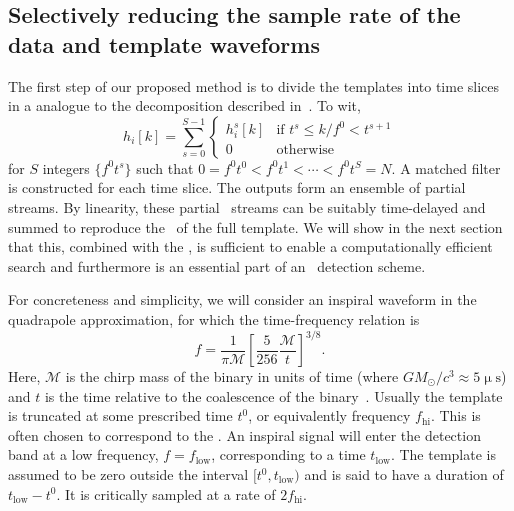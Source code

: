\subsection{Selectively reducing the sample rate of the data and template waveforms}

The first step of our proposed method is to divide the templates into time
slices in a \TD{} analogue to the \FD{} decomposition described
in~\citep{Marion2004, Buskulic2010}.  To wit,
%
\begin{equation}
\label{eq:time-slices}
h_{i}[k] = \sum_{s=0}^{S-1}
	\begin{cases}
		h_i^s[k] & \textrm{if } t^s \leqslant k / f^0 < t^{s+1} \\
		0 & \textrm{otherwise}
	\end{cases}
\end{equation}
%
for $S$ integers $\{f^0 t^s\}$ such that $0  = f^0 t^0 < f^0 t^1 < \cdots < f^0
t^S = N$.  A matched filter is constructed for each time slice.  The outputs
form an ensemble of partial \SNR{} streams.  By linearity, these partial \SNR\
streams can be suitably time-delayed and summed to reproduce the \SNR\ of the
full template.  We will show in the next section that this, combined with the
\SVD{}, is sufficient to enable a computationally efficient \TD{} search and
furthermore is an essential part of an \earlywarning\ detection scheme.

For concreteness and simplicity, we will consider an inspiral waveform in the
quadrapole approximation, for which the time-frequency relation is
%
\begin{equation} \label{eq:fgw}
%
f = \frac{1}{\mathcal{\pi M}} \left[ \frac{5}{256}\frac{\mathcal{M}}{t}
\right]^{3/8}.
%
\end{equation}
%
Here, $\mathcal{M}$ is the chirp mass of the binary in units of time (where $G
M_\odot / c^3 \approx 5 \upmu\mathrm{s}$) and $t$ is the time relative to the
coalescence of the binary~\citep{findchirppaper, kidder1992}.  Usually the
template is truncated at some prescribed time $t^0$, or equivalently frequency
$f_\mathrm{hi}$.  This is often chosen to correspond to the \ISCO. An inspiral
signal will enter the detection band at a low frequency, $f = f_\mathrm{low}$,
corresponding to a time $t_\mathrm{low}$.  The template is assumed to be zero
outside the interval $[t^0, t_\mathrm{low})$ and is said to have  a duration of
$t_\mathrm{low} - t^0$. It is critically sampled at a rate of $2
f_\mathrm{hi}$.

